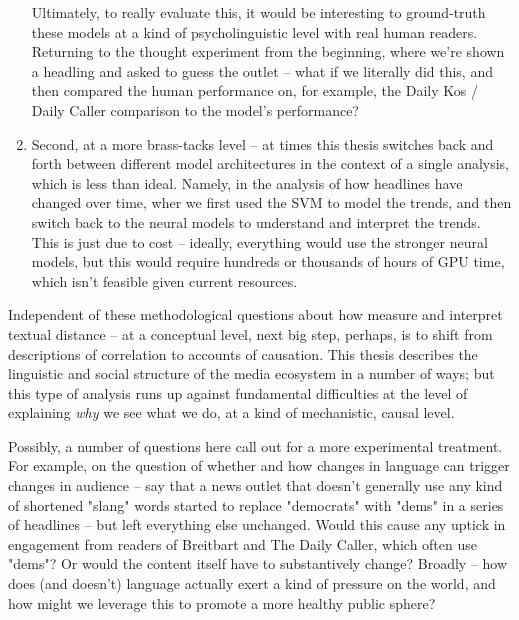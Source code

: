 \documentclass{scrartcl}
\begin{document}
\begin{enumerate}
Ultimately, to really evaluate this, it would be interesting to ground-truth these models at a kind of psycholinguistic level with real human readers. Returning to the thought experiment from the beginning, where we're shown a headling and asked to guess the outlet -- what if we literally did this, and then compared the human performance on, for example, the Daily Kos / Daily Caller comparison to the model's performance?

\item Second, at a more brass-tacks level -- at times this thesis switches back and forth between different model architectures in the context of a single analysis, which is less than ideal. Namely, in the analysis of how headlines have changed over time, wher we first used the SVM to model the trends, and then switch back to the neural models to understand and interpret the trends. This is just due to cost -- ideally, everything would use the stronger neural models, but this would require hundreds or thousands of hours of GPU time, which isn't feasible given current resources.
\end{enumerate}

Independent of these methodological questions about how measure and interpret textual distance -- at a conceptual level, next big step, perhaps, is to shift from descriptions of correlation to accounts of causation. This thesis describes the linguistic and social structure of the media ecosystem in a number of ways; but this type of analysis runs up against fundamental difficulties at the level of explaining \textit{why} we see what we do, at a kind of mechanistic, causal level.

Possibly, a number of questions here call out for a more experimental treatment. For example, on the question of whether and how changes in language can trigger changes in audience -- say that a news outlet that doesn't generally use any kind of shortened "slang" words started to replace "democrats" with "dems" in a series of headlines -- but left everything else unchanged. Would this cause any uptick in engagement from readers of Breitbart and The Daily Caller, which often use "dems"? Or would the content itself have to substantively change? Broadly -- how does (and doesn't) language actually exert a kind of pressure on the world, and how might we leverage this to promote a more healthy public sphere?

{}

\end{document}
